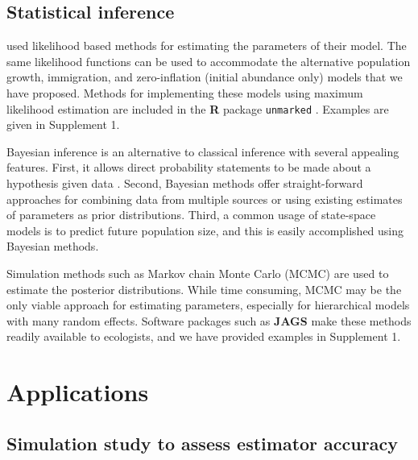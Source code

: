 \documentclass[12pt,english]{article}
\begin{document}
\begin{spacing}{1.9}
\begin{flushleft}
\subsection*{Statistical inference}

\citet{dail_madsen:2011} used likelihood based methods for estimating
the parameters of their model. The same likelihood functions can be
used to accommodate the alternative population growth, immigration, and 
zero-inflation (initial abundance only) models that we
have proposed. Methods for implementing these models using maximum 
likelihood estimation are included in the 
\textbf{R} package \texttt{unmarked} \citep{fiske_chandler:2011}. Examples
are given in Supplement 1.

Bayesian inference is an alternative to classical inference with
several appealing features. First, it allows direct probability
statements to be made about a hypothesis given data
\citep{link_barker:2010}.  Second, Bayesian methods offer
straight-forward approaches for combining data from multiple sources
or using existing estimates of parameters as prior distributions. Third,
a common usage of state-space models is to predict future
population size, and this is easily accomplished using Bayesian
methods.

Simulation methods such as Markov chain Monte Carlo (MCMC)
are used to estimate the posterior distributions. While time 
consuming, MCMC may be the only viable approach for estimating
parameters, especially for hierarchical models with many random
effects.  
Software packages such as 
\textbf{JAGS} \citep{plummer:2003} make these methods readily
available to ecologists, and we have provided examples in 
Supplement 1. 


\section*{Applications}
\label{sec:app}

\subsection*{Simulation study to assess estimator accuracy}



\end{flushleft}
\end{spacing}
\end{document}

